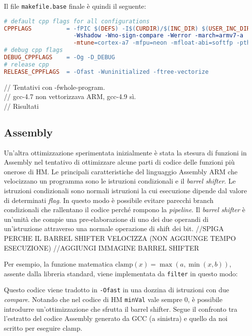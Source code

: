 Il file \verb|makefile.base| finale è quindi il seguente:\\

\begin{lstlisting}[language=make]
# default cpp flags for all configurations
CPPFLAGS          = -fPIC $(DEFS) -I$(CURDIR)/$(INC_DIR) $(USER_INC_DIRS) -Wall 
                    -Wshadow -Wno-sign-compare -Werror -march=armv7-a 
                    -mtune=cortex-a7 -mfpu=neon -mfloat-abi=softfp -pthread
# debug cpp flags
DEBUG_CPPFLAGS    = -Og -D_DEBUG
# release cpp
RELEASE_CPPFLAGS  = -Ofast -Wuninitialized -ftree-vectorize
\end{lstlisting}


// Tentativi con -fwhole-program.\\
// gcc-4.7 non vettorizzava ARM, gcc-4.9 sì.\\
// Risultati\\
\subsection{Assembly}
Un'altra ottimizzazione sperimentata inizialmente è stata la stesura di 
funzioni in Assembly nel tentativo di ottimizzare alcune parti di codice delle 
funzioni più onerose di HM.
Le principali caratteristiche del linguaggio Assembly ARM che velocizzano un 
programma sono le istruzioni condizionali e il \emph{barrel shifter}. \newline
Le istruzioni condizionali sono normali istruzioni la cui esecuzione dipende
dal valore di determinati \emph{flag}. In questo modo è possibile evitare 
parecchi branch condizionali che rallentano il codice perché rompono la 
\emph{pipeline}.\newline
Il \emph{barrel shifter} è un'unità che compie una pre-elaborazione di uno dei 
due operandi di un'istruzione attraverso una normale operazione di shift dei 
bit. \newline
//SPIGA PERCHE IL BARREL SHIFTER VELOCIZZA (NON AGGIUNGE TEMPO ESECUZIONE)
//AGGIUNGI IMMAGINE BARREL SHIFTER \newline

\par Per esempio, la funzione matematica $\text{clamp}(x) = 
\max(a,\min(x,b))$, assente dalla libreria standard, viene implementata da 
\verb+filter+ in questo modo:

Questo codice viene tradotto in \verb|-Ofast| in una dozzina di istruzioni con 
due \emph{compare}. Notando che nel codice di HM \verb|minVal| vale sempre 0, è 
possibile introdurre un'ottimizzazione che sfrutta il barrel shifter. \newline
Segue il confronto tra l'estratto del codice Assembly generato da GCC (a 
sinistra) e quello da noi scritto per eseguire clamp.

